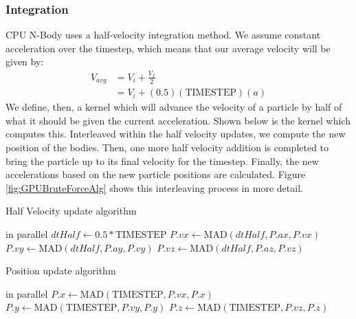 \documentclass{thesis}
\begin{document}
\subsubsection{Integration}
CPU N-Body uses a half-velocity integration method. We assume constant acceleration over the timestep, which means that our average velocity will be given by:
\begin{align}
    V_{avg} &= V_i + \frac{V_f}{2}\\
            &= V_i + (0.5)(\text{TIMESTEP})(a)
\end{align}
We define, then, a kernel which will advance the velocity of a particle by half of what it should be given the current acceleration. Shown below is the kernel which computes this.
Interleaved within the half velocity updates, we compute the new position of the bodies. Then, one more half velocity addition is completed to bring the particle up to its final velocity for the timestep. Finally, the new accelerations based on the new particle positions are calculated. Figure \ref{fig:GPUBruteForceAlg} shows this interleaving process in more detail.
\begin{algorithm}
    \label{alg:HalfVelocity}
    \caption{Half Velocity update algorithm}
    \begin{algorithmic}
         in parallel
            \State $dtHalf \gets 0.5 * \text{TIMESTEP}$
            \State $P.vx \gets \text{MAD}(dtHalf, P.ax, P.vx)$
            \State $P.vy \gets \text{MAD}(dtHalf, P.ay, P.vy)$
            \State $P.vz \gets \text{MAD}(dtHalf, P.az, P.vz)$
        \EndFor
    \end{algorithmic}
\end{algorithm}
\begin{algorithm}
    \label{alg:PositionUpdate}
    \caption{Position update algorithm}
    \begin{algorithmic}
         in parallel
            \State $P.x \gets \text{MAD}(\text{TIMESTEP}, P.vx, P.x)$
            \State $P.y \gets \text{MAD}(\text{TIMESTEP}, P.vy, P.y)$
            \State $P.z \gets \text{MAD}(\text{TIMESTEP}, P.vz, P.z)$
        \EndFor
    \end{algorithmic}
\end{algorithm}
\end{document}
